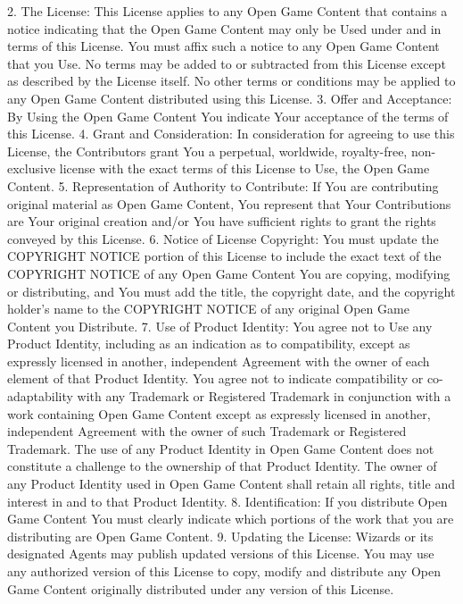 {2. The License: This License applies to any Open Game Content that contains a notice indicating that the Open Game Content may only be Used under and in terms of this License. You must affix such a notice to any Open Game Content that you Use. No terms may be added to or subtracted from this License except as described by the License itself. No other terms or conditions may be applied to any Open Game Content distributed using this License.
3. Offer and Acceptance: By Using the Open Game Content You indicate Your acceptance of the terms of this License.
4. Grant and Consideration: In consideration for agreeing to use this License, the Contributors grant You a perpetual, worldwide, royalty-free, non-exclusive license with the exact terms of this License to Use, the Open Game Content.
5. Representation of Authority to Contribute: If You are contributing original material as Open Game Content, You represent that Your Contributions are Your original creation and/or You have sufficient rights to grant the rights conveyed by this License.
6. Notice of License Copyright: You must update the COPYRIGHT NOTICE portion of this License to include the exact text of the COPYRIGHT NOTICE of any Open Game Content You are copying, modifying or distributing, and You must add the title, the copyright date, and the copyright holder's name to the COPYRIGHT NOTICE of any original Open Game Content you Distribute.
7. Use of Product Identity: You agree not to Use any Product Identity, including as an indication as to compatibility, except as expressly licensed in another, independent Agreement with the owner of each element of that Product Identity. You agree not to indicate compatibility or co-adaptability with any Trademark or Registered Trademark in conjunction with a work containing Open Game Content except as expressly licensed in another, independent Agreement with the owner of such Trademark or Registered Trademark. The use of any Product Identity in Open Game Content does not constitute a challenge to the ownership of that Product Identity. The owner of any Product Identity used in Open Game Content shall retain all rights, title and interest in and to that Product Identity.
8. Identification: If you distribute Open Game Content You must clearly indicate which portions of the work that you are distributing are Open Game Content.
9. Updating the License: Wizards or its designated Agents may publish updated versions of this License. You may use any authorized version of this License to copy, modify and distribute any Open Game Content originally distributed under any version of this License.
}
